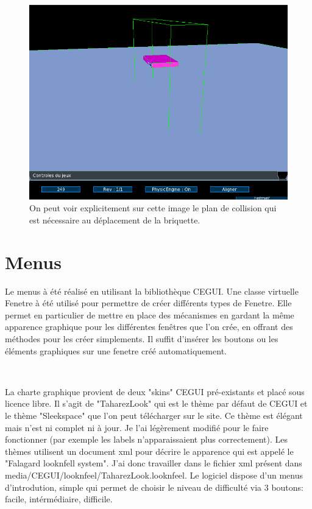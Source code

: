 \documentclass[frenchb,twoside]{EPURapport}
\begin{document}
		\newpage
		
		\begin{figure}[h]
			\centering
			\includegraphics[width=16cm]{images/move_briquette.png}
			\caption{\label{fig:move_briquette}On peut voir explicitement sur cette image le plan de collision
			qui est nécessaire au déplacement de la briquette.}
		\end{figure}
		
		
    

    \section{Menus}
        Le menus à été réalisé en utilisant la bibliothèque CEGUI. Une classe
        virtuelle Fenetre à été utilisé pour permettre de créer différents
        types de Fenetre. Elle permet en particulier de mettre en place des
        mécanismes en gardant la même apparence graphique pour les différentes
        fenêtres que l'on crée, en offrant des méthodes pour les créer
        simplements. Il suffit d'insérer les boutons ou les éléments graphiques
        sur une fenetre créé automatiquement.
        
        \
        
        La charte graphique provient de deux "skins" CEGUI pré-existants et
        placé sous licence libre. Il s'agit de "TaharezLook" qui est le thème
        par défaut de CEGUI et le thème "Sleekspace" que l'on peut télécharger
        sur le site. Ce thème est élégant mais n'est ni complet ni à jour. Je
        l'ai légèrement modifié pour le faire fonctionner (par exemple les
        labels n'apparaissaient plus correctement). Les thèmes utilisent un
        document xml pour décrire le apparence qui est appelé le "Falagard
        looknfell system". J'ai donc travailler dans le fichier xml présent
        dans media/CEGUI/looknfeel/TaharezLook.looknfeel.
        Le logiciel dispose d'un menus d'introdution, simple qui permet de
        choisir le niveau de difficulté via 3 boutons: facile, intérmédiaire,
        difficile.
\end{document}
